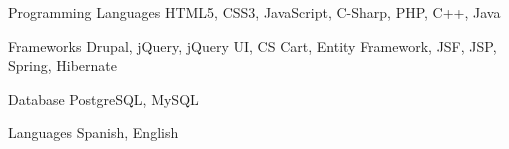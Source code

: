 


\begin{cvskills}


\cvskill
{Programming Languages} %
{HTML5, CSS3, JavaScript, C-Sharp, PHP, C++, Java} %


\cvskill
{Frameworks} %
{Drupal, jQuery, jQuery UI, CS Cart, Entity Framework, JSF, JSP, Spring, Hibernate} %


\cvskill
{Database} %
{PostgreSQL, MySQL} %


\cvskill
{Languages} %
{Spanish, English} %




\end{cvskills}

